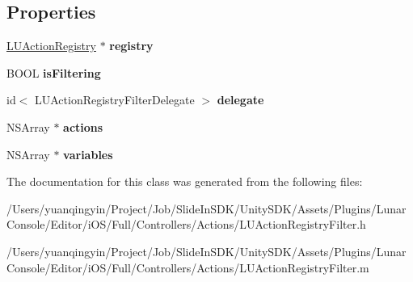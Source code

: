 \subsection*{Properties}
\begin{DoxyCompactItemize}
\item 
\mbox{\label{interface_l_u_action_registry_filter_af924c8300efd2384c44b24bcd9750d4e}} 
\mbox{\hyperlink{interface_l_u_action_registry}{L\+U\+Action\+Registry}} $\ast$ {\bfseries registry}
\item 
\mbox{\label{interface_l_u_action_registry_filter_a6f616ceb921b738f763518e72cf0a91c}} 
B\+O\+OL {\bfseries is\+Filtering}
\item 
\mbox{\label{interface_l_u_action_registry_filter_a79a2bbc900344c361dff8c40c2ae8d9f}} 
id$<$ L\+U\+Action\+Registry\+Filter\+Delegate $>$ {\bfseries delegate}
\item 
\mbox{\label{interface_l_u_action_registry_filter_ac9c09a1f46bc3dcfde85b107992dec9e}} 
N\+S\+Array $\ast$ {\bfseries actions}
\item 
\mbox{\label{interface_l_u_action_registry_filter_a3c6f9e17e1d9b0ef9386b1bc4c0f1052}} 
N\+S\+Array $\ast$ {\bfseries variables}
\end{DoxyCompactItemize}


The documentation for this class was generated from the following files\+:\begin{DoxyCompactItemize}
\item 
/\+Users/yuanqingyin/\+Project/\+Job/\+Slide\+In\+S\+D\+K/\+Unity\+S\+D\+K/\+Assets/\+Plugins/\+Lunar\+Console/\+Editor/i\+O\+S/\+Full/\+Controllers/\+Actions/L\+U\+Action\+Registry\+Filter.\+h\item 
/\+Users/yuanqingyin/\+Project/\+Job/\+Slide\+In\+S\+D\+K/\+Unity\+S\+D\+K/\+Assets/\+Plugins/\+Lunar\+Console/\+Editor/i\+O\+S/\+Full/\+Controllers/\+Actions/L\+U\+Action\+Registry\+Filter.\+m\end{DoxyCompactItemize}
